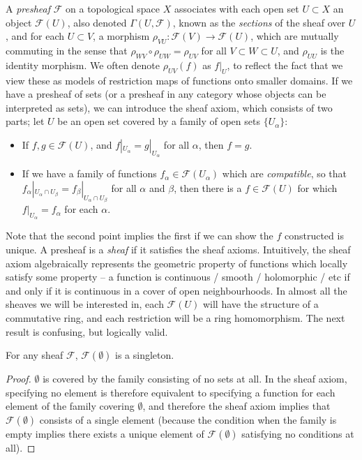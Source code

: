 A \emph{presheaf} $\mathcal{F}$ on a topological space $X$ associates with each open set $U \subset X$ an object $\mathcal{F}(U)$, also denoted $\Gamma(U,\mathcal{F})$, known as the {\it sections} of the sheaf over $U$, and for each $U \subset V$, a morphism $\rho_{VU}: \mathcal{F}(V) \to \mathcal{F}(U)$, which are mutually commuting in the sense that $\rho_{WV} \circ \rho_{UW} = \rho_{UV}$ for all $V \subset W \subset U$, and $\rho_{UU}$ is the identity morphism. We often denote $\rho_{UV}(f)$ as $f|_U$, to reflect the fact that we view these as models of restriction maps of functions onto smaller domains. If we have a presheaf of sets (or a presheaf in any category whose objects can be interpreted as sets), we can introduce the sheaf axiom, which consists of two parts; let $U$ be an open set covered by a family of open sets $\{ U_\alpha \}$:
%
\begin{itemize}
    \item If $f,g \in \mathcal{F}(U)$, and $f|_{U_\alpha} = g|_{U_\alpha}$ for all $\alpha$, then $f = g$.

    \item If we have a family of functions $f_\alpha \in \mathcal{F}(U_\alpha)$ which are {\it compatible}, so that $f_\alpha|_{U_\alpha \cap U_\beta} = f_\beta|_{U_\alpha \cap U_\beta}$ for all $\alpha$ and $\beta$, then there is a $f \in \mathcal{F}(U)$ for which $f|_{U_\alpha} = f_\alpha$ for each $\alpha$.
\end{itemize}
%
Note that the second point implies the first if we can show the $f$ constructed is unique. A presheaf is a \emph{sheaf} if it satisfies the sheaf axioms. Intuitively, the sheaf axiom algebraically represents the geometric property of functions which locally satisfy some property -- a function is continuous / smooth / holomorphic / etc if and only if it is continuous in a cover of open neighbourhoods. In almost all the sheaves we will be interested in, each $\mathcal{F}(U)$ will have the structure of a commutative ring, and each restriction will be a ring homomorphism. The next result is confusing, but logically valid.

\begin{lemma}
    For any sheaf $\mathcal{F}$, $\mathcal{F}(\emptyset)$ is a singleton.
\end{lemma}
\begin{proof}
    $\emptyset$ is covered by the family consisting of no sets at all. In the sheaf axiom, specifying no element is therefore equivalent to specifying a function for each element of the family covering $\emptyset$, and therefore the sheaf axiom implies that $\mathcal{F}(\emptyset)$ consists of a single element (because the condition when the family is empty implies there exists a unique element of $\mathcal{F}(\emptyset)$ satisfying no conditions at all).
\end{proof}

